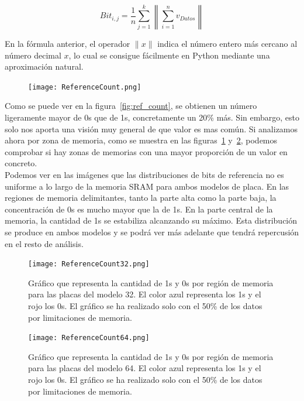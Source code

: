 \documentclass[spanish]{template/minim}
\begin{document}
\begin{equation}
    Bit_{i,j} = \frac{1}{n} \sum\limits^k_{j=1} \left\| \sum\limits^n_{i=1}v_{Datos} \right\|
    \label{eq:bit_ref}
\end{equation}

En la fórmula anterior, el operador $\| x \|$ indica el número entero más cercano al número decimal $x$, lo cual se consigue fácilmente en Python mediante una aproximación natural.\\

\begin{figure}[H]
    \centering
    \texttt{[image: ReferenceCount.png]}
\end{figure}


Como se puede ver en la figura~\ref{fig:ref_count}, se obtienen un número ligeramente mayor de 0s que de 1s, concretamente un 20\% más. Sin embargo, esto solo nos aporta una visión muy general de que valor es mas común. Si analizamos ahora por zona de memoria, como se muestra en las figuras~\ref{fig:ref_32} y~\ref{fig:ref_64}, podemos comprobar si hay zonas de memorias con una mayor proporción de un valor en concreto.\\

Podemos ver en las imágenes que las distribuciones de bits de referencia no es uniforme a lo largo de la memoria SRAM para ambos modelos de placa. En las regiones de memoria delimitantes, tanto la parte alta como la parte baja, la concentración de 0s es mucho mayor que la de 1s. En la parte central de la memoria, la cantidad de 1s se estabiliza alcanzando su máximo. Esta distribución se produce en ambos modelos y se podrá ver más adelante que tendrá repercusión en el resto de análisis.\\

\begin{fullwidth}
\begin{figure}[H]
    \centering
    \texttt{[image: ReferenceCount32.png]}
    \caption[Bits de referencia para el modelo 32]{
        Gráfico que representa la cantidad de 1s y 0s por región de memoria para las placas del modelo 32. El color azul representa los 1s y el rojo los 0s. El gráfico se ha realizado solo con el 50\% de los datos por limitaciones de memoria.\label{fig:ref_32}
    }
\end{figure}

\begin{figure}[H]
    \centering
    \texttt{[image: ReferenceCount64.png]}
    \caption[Bits de referencia para el modelo 64]{
        Gráfico que representa la cantidad de 1s y 0s por región de memoria para las placas del modelo 64. El color azul representa los 1s y el rojo los 0s. El gráfico se ha realizado solo con el 50\% de los datos por limitaciones de memoria.\label{fig:ref_64}
    }
\end{figure}
\end{fullwidth}
\end{document}
